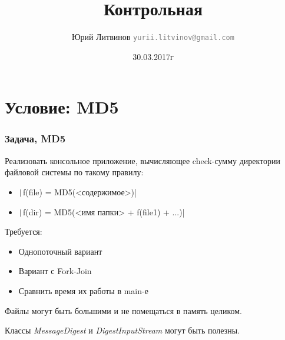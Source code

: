 \documentclass[xetex,mathserif,serif]{beamer}
\title{Контрольная}
\author[Юрий Литвинов]{Юрий Литвинов \newline \textcolor{gray}{\small\texttt{yurii.litvinov@gmail.com}}}
\date{30.03.2017г}
\begin{document}
	
	\frame{\titlepage}
	
	\section{Условие: MD5}

	\begin{frame}
		\frametitle{Задача, MD5}
		Реализовать консольное приложение, вычисляющее check-сумму директории файловой системы по такому правилу:
		\begin{itemize}
			\item \texttt|f(file) = MD5(<содержимое>)|
			\item \texttt|f(dir) = MD5(<имя папки> + f(file1) + ...)|
		\end{itemize}
		Требуется:
		\begin{itemize}
			\item Однопоточный вариант
			\item Вариант с Fork-Join
			\item Сравнить время их работы в main-е
		\end{itemize}
		Файлы могут быть большими и не помещаться в память целиком.
		
		Классы \textit{MessageDigest} и \textit{DigestInputStream} могут быть полезны. 
	\end{frame}
\end{document}
